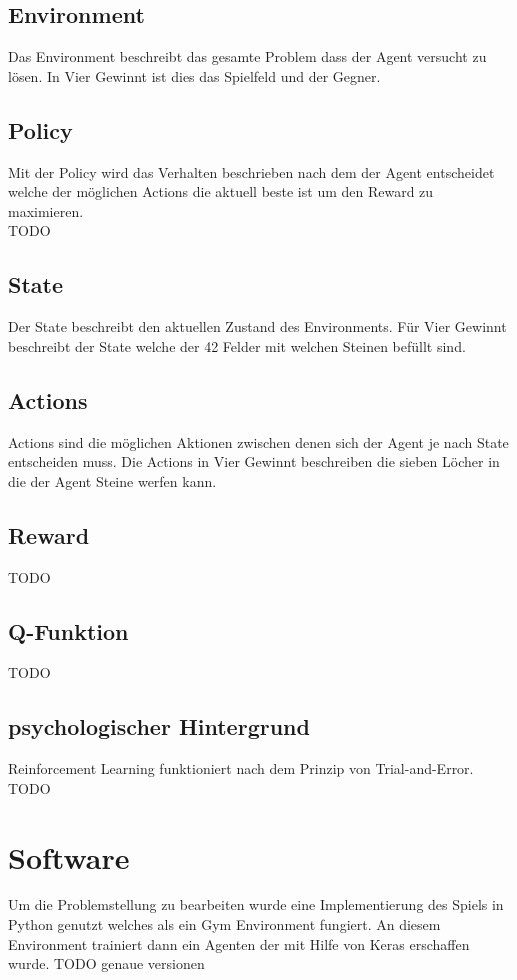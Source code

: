 \subsection{Environment}
Das Environment beschreibt das gesamte Problem dass der Agent versucht zu lösen.
In Vier Gewinnt ist dies das Spielfeld und der Gegner. 

\subsection{Policy}
Mit der Policy wird das Verhalten beschrieben nach dem der Agent entscheidet welche der möglichen Actions die aktuell beste ist um den Reward zu maximieren.\\
\colorbox{red!30}{TODO} %

\subsection{State}
Der State beschreibt den aktuellen Zustand des Environments.
Für Vier Gewinnt beschreibt der State welche der 42 Felder mit welchen Steinen befüllt sind. 

\subsection{Actions}
Actions sind die möglichen Aktionen zwischen denen sich der Agent je nach State entscheiden muss.
Die Actions in Vier Gewinnt beschreiben die sieben Löcher in die der Agent Steine werfen kann.

\subsection{Reward}
\colorbox{red!30}{TODO} %

\subsection{Q-Funktion}
\colorbox{red!30}{TODO} %

\subsection{psychologischer Hintergrund}
Reinforcement Learning funktioniert nach dem Prinzip von Trial-and-Error.\\
\colorbox{red!30}{TODO} %



\section{Software}
Um die Problemstellung zu bearbeiten wurde eine Implementierung des Spiels in Python genutzt welches als ein Gym Environment fungiert. An diesem Environment trainiert dann ein Agenten der mit Hilfe von  Keras erschaffen wurde.
\colorbox{red!30}{TODO genaue versionen}

